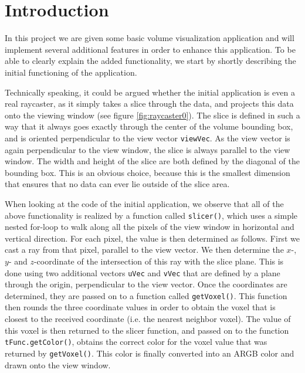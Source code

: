 \section{Introduction}\label{sec:intro}
In this project we are given some basic volume visualization application and will implement several additional features in order to enhance this application. To be able to clearly explain the added functionality, we start by shortly describing the initial functioning of the application.

Technically speaking, it could be argued whether the initial application is even a real raycaster, as it simply takes a slice through the data, and projects this data onto the viewing window (see figure \ref{fig:raycaster0}). The slice is defined in such a way that it always goes exactly through the center of the volume bounding box, and is oriented perpendicular to the view vector \texttt{viewVec}. As the view vector is again perpendicular to the view window, the slice is always parallel to the view window. The width and height of the slice are both defined by the diagonal of the bounding box. This is an obvious choice, because this is the smallest dimension that ensures that no data can ever lie outside of the slice area.

When looking at the code of the initial application, we observe that all of the above functionality is realized by a function called \texttt{slicer()}, which uses a simple nested for-loop to walk along all the pixels of the view window in horizontal and vertical direction. For each pixel, the value is then determined as follows. First we cast a ray from that pixel, parallel to the view vector. We then determine the $x$-, $y$- and $z$-coordinate of the intersection of this ray with the slice plane.
This is done using two additional vectors \texttt{uVec} and \texttt{vVec} that are defined by a plane through the origin, perpendicular to the view vector.
Once the coordinates are determined, they are passed on to a function called \texttt{getVoxel()}. This function then rounds the three coordinate values in order to obtain the voxel that is closest to the received coordinate (i.e. the nearest neighbor voxel). The value of this voxel is then returned to the slicer function, and passed on to the function \texttt{tFunc.getColor()}, obtains the correct color for the voxel value that was returned by \texttt{getVoxel()}. This color is finally converted into an ARGB color and drawn onto the view window.

